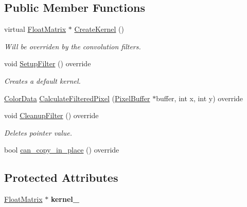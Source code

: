 \subsection*{Public Member Functions}
\begin{DoxyCompactItemize}
\item 
\mbox{\label{classimage__tools_1_1ConvolutionFilter_aac988aaa5e27213ea874d9bd3eb1dbdb}} 
virtual \hyperlink{classimage__tools_1_1FloatMatrix}{Float\+Matrix} $\ast$ \hyperlink{classimage__tools_1_1ConvolutionFilter_aac988aaa5e27213ea874d9bd3eb1dbdb}{Create\+Kernel} ()
\begin{DoxyCompactList}\small\item\em Will be overriden by the convolution filters. \end{DoxyCompactList}\item 
\mbox{\label{classimage__tools_1_1ConvolutionFilter_a49be1e3b2affd935378eb12d4f240048}} 
void \hyperlink{classimage__tools_1_1ConvolutionFilter_a49be1e3b2affd935378eb12d4f240048}{Setup\+Filter} () override
\begin{DoxyCompactList}\small\item\em Creates a default kernel. \end{DoxyCompactList}\item 
\hyperlink{classimage__tools_1_1ColorData}{Color\+Data} \hyperlink{classimage__tools_1_1ConvolutionFilter_a2d35a2e2a2d1303d0a6824b16406d97b}{Calculate\+Filtered\+Pixel} (\hyperlink{classimage__tools_1_1PixelBuffer}{Pixel\+Buffer} $\ast$buffer, int x, int y) override
\item 
\mbox{\label{classimage__tools_1_1ConvolutionFilter_a67668b9a965491b1184ce645ac3250ed}} 
void \hyperlink{classimage__tools_1_1ConvolutionFilter_a67668b9a965491b1184ce645ac3250ed}{Cleanup\+Filter} () override
\begin{DoxyCompactList}\small\item\em Deletes pointer value. \end{DoxyCompactList}\item 
bool \hyperlink{classimage__tools_1_1ConvolutionFilter_aef03779d74d96173880d93d06c7bd6b6}{can\+\_\+copy\+\_\+in\+\_\+place} () override
\end{DoxyCompactItemize}
\subsection*{Protected Attributes}
\begin{DoxyCompactItemize}
\item 
\mbox{\label{classimage__tools_1_1ConvolutionFilter_a4ef900e0e03585707fce8b71afd40c5d}} 
\hyperlink{classimage__tools_1_1FloatMatrix}{Float\+Matrix} $\ast$ {\bfseries kernel\+\_\+}
\end{DoxyCompactItemize}


